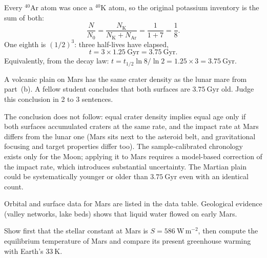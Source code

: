\begin{solution}
Every $^{40}\mathrm{Ar}$ atom was once a $^{40}\mathrm{K}$ atom, so the original potassium inventory is the sum of both:
\[
  \frac{N}{N_0} = \frac{N_{\mathrm{K}}}{N_{\mathrm{K}} + N_{\mathrm{Ar}}} = \frac{1}{1 + 7} = \frac{1}{8}.
\]
One eighth is $(1/2)^3$: three half-lives have elapsed,
\[
  t = 3 \times 1.25\ \mathrm{Gyr} = 3.75\ \mathrm{Gyr}.
\]
Equivalently, from the decay law: $t = t_{1/2} \ln 8 / \ln 2 = 1.25 \times 3 = 3.75\ \mathrm{Gyr}$.
\end{solution}

\parti {} A volcanic plain on Mars has the same crater density as the lunar mare from part~(b).
A fellow student concludes that both surfaces are $3.75\ \mathrm{Gyr}$ old.
Judge this conclusion in 2 to 3 sentences.

\begin{solution}
The conclusion does not follow: equal crater density implies equal age only if both surfaces accumulated craters at the same rate, and the impact rate at Mars differs from the lunar one (Mars sits next to the asteroid belt, and gravitational focusing and target properties differ too).
The sample-calibrated chronology exists only for the Moon; applying it to Mars requires a model-based correction of the impact rate, which introduces substantial uncertainty.
The Martian plain could be systematically younger or older than $3.75\ \mathrm{Gyr}$ even with an identical count.
\end{solution}



Orbital and surface data for Mars are listed in the data table.
Geological evidence (valley networks, lake beds) shows that liquid water flowed on early Mars.

\parti {} Show first that the stellar constant at Mars is $S = 586\ \mathrm{W\,m^{-2}}$, then compute the equilibrium temperature of Mars and compare its present greenhouse warming with Earth's $33\ \mathrm{K}$.

